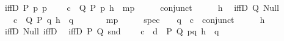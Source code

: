 \begin{isabellebody}
\isanewline
\ \ iffD{}\ {\isacharparenleft}{\kern0pt}P{\isacharparenright}{\kern0pt}{\isacharcolon}{\kern0pt}\ {\isachardoublequoteopen}{\isasymlambda}p{\isachardot}{\kern0pt}\ p{\isachardoublequoteclose}\isanewline
\ \ \ \ {\isachardoublequoteopen}\isactrlbold {\isasymlambda}{\isacharparenleft}{\kern0pt}c{\isacharcolon}{\kern0pt}\ {\isacharunderscore}{\kern0pt}{\isacharparenright}{\kern0pt}\ Q\ P\ p\ {\isacharparenleft}{\kern0pt}h{\isacharcolon}{\kern0pt}\ {\isacharunderscore}{\kern0pt}{\isacharparenright}{\kern0pt}{\isachardot}{\kern0pt}\ mp\ {\isasymcdot}\ {\isacharunderscore}{\kern0pt}\ {\isasymcdot}\ {\isacharunderscore}{\kern0pt}\ {\isasymbullet}\ {\isacharparenleft}{\kern0pt}conjunct{}\ {\isasymcdot}\ {\isacharunderscore}{\kern0pt}\ {\isasymcdot}\ {\isacharunderscore}{\kern0pt}\ {\isasymbullet}\ h{\isacharparenright}{\kern0pt}{\isachardoublequoteclose}\isanewline
\isanewline
\ \ iffD{}\ {\isacharparenleft}{\kern0pt}Q{\isacharparenright}{\kern0pt}{\isacharcolon}{\kern0pt}\ {\isachardoublequoteopen}Null{\isachardoublequoteclose}\isanewline
\ \ \ \ {\isachardoublequoteopen}\isactrlbold {\isasymlambda}{\isacharparenleft}{\kern0pt}c{\isacharcolon}{\kern0pt}\ {\isacharunderscore}{\kern0pt}{\isacharparenright}{\kern0pt}\ Q\ P\ q{}\ {\isacharparenleft}{\kern0pt}h{\isacharcolon}{\kern0pt}\ {\isacharunderscore}{\kern0pt}{\isacharparenright}{\kern0pt}\ q{}{\isachardot}{\kern0pt}\isanewline
\ \ \ \ \ \ \ mp\ {\isasymcdot}\ {\isacharunderscore}{\kern0pt}\ {\isasymcdot}\ {\isacharunderscore}{\kern0pt}\ {\isasymbullet}\ {\isacharparenleft}{\kern0pt}spec\ {\isasymcdot}\ {\isacharunderscore}{\kern0pt}\ {\isasymcdot}\ q{}\ {\isasymbullet}\ c\ {\isasymbullet}\ {\isacharparenleft}{\kern0pt}conjunct{}\ {\isasymcdot}\ {\isacharunderscore}{\kern0pt}\ {\isasymcdot}\ {\isacharunderscore}{\kern0pt}\ {\isasymbullet}\ h{\isacharparenright}{\kern0pt}{\isacharparenright}{\kern0pt}{\isachardoublequoteclose}\isanewline
\isanewline
\ \ iffD{}{\isacharcolon}{\kern0pt}\ {\isachardoublequoteopen}Null{\isachardoublequoteclose}\ {\isachardoublequoteopen}iffD{}{\isachardoublequoteclose}\isanewline
\isanewline
\ \ iffD{}\ {\isacharparenleft}{\kern0pt}P{\isacharcomma}{\kern0pt}\ Q{\isacharparenright}{\kern0pt}{\isacharcolon}{\kern0pt}\ {\isachardoublequoteopen}snd{\isachardoublequoteclose}\isanewline
\ \ \ \ {\isachardoublequoteopen}\isactrlbold {\isasymlambda}{\isacharparenleft}{\kern0pt}c{\isacharcolon}{\kern0pt}\ {\isacharunderscore}{\kern0pt}{\isacharparenright}{\kern0pt}\ {\isacharparenleft}{\kern0pt}d{\isacharcolon}{\kern0pt}\ {\isacharunderscore}{\kern0pt}{\isacharparenright}{\kern0pt}\ P\ Q\ pq\ {\isacharparenleft}{\kern0pt}h{\isacharcolon}{\kern0pt}\ {\isacharunderscore}{\kern0pt}{\isacharparenright}{\kern0pt}\ q{\isachardot}{\kern0pt}\isanewline

\end{isabellebody}
